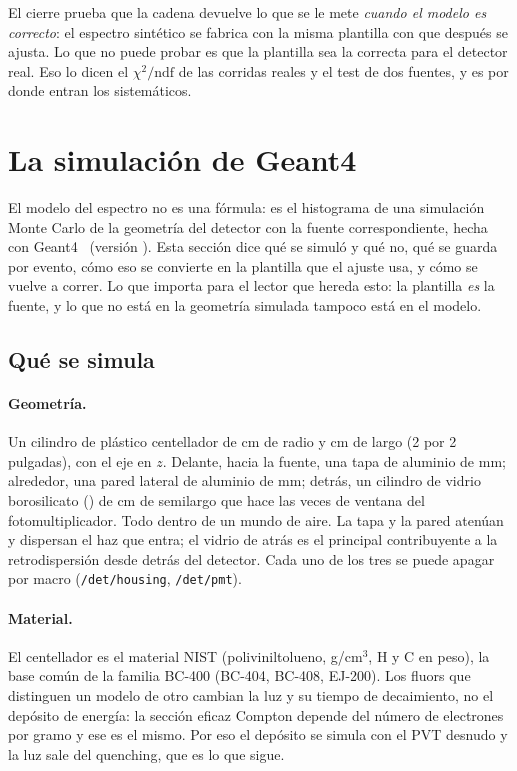 \documentclass[11pt,a4paper]{article}
\begin{document}
\begin{aviso}
El cierre prueba que la cadena devuelve lo que se le mete \emph{cuando el
modelo es correcto}: el espectro sintético se fabrica con la misma plantilla
con que después se ajusta. Lo que no puede probar es que la plantilla sea la
correcta para el detector real. Eso lo dicen el $\chi^2/\text{ndf}$ de las
corridas reales y el test de dos fuentes, y es por donde entran los
sistemáticos.
\end{aviso}

\section{La simulación de Geant4}
\label{sec:geant4}

El modelo del espectro no es una fórmula: es el histograma de una simulación
Monte Carlo de la geometría del detector con la fuente correspondiente, hecha
con Geant4~\cite{agostinelli2003,allison2016} (versión \SimVersion). Esta
sección dice qué se simuló y qué no, qué se guarda por evento, cómo eso se
convierte en la plantilla que el ajuste usa, y cómo se vuelve a correr. Lo que
importa para el lector que hereda esto: la plantilla \emph{es} la fuente, y
lo que no está en la geometría simulada tampoco está en el modelo.

\subsection{Qué se simula}

\paragraph{Geometría.} Un cilindro de plástico centellador de \SimRadio{} cm de
radio y \SimLargo{} cm de largo (2 por 2 pulgadas), con el eje en $z$. Delante,
hacia la fuente, una tapa de aluminio de \SimTapa{} mm; alrededor, una pared
lateral de aluminio de \SimPared{} mm; detrás, un cilindro de vidrio
borosilicato (\SimVentanaPmt) de \SimPmtSemilargo{} cm de semilargo que hace
las veces de ventana del fotomultiplicador. Todo dentro de un mundo de aire.
La tapa y la pared atenúan y dispersan el haz que entra; el vidrio de atrás es
el principal contribuyente a la retrodispersión desde detrás del detector.
Cada uno de los tres se puede apagar por macro (\texttt{/det/housing},
\texttt{/det/pmt}).

\paragraph{Material.} El centellador es el material NIST
\SimMaterial{} (poliviniltolueno, \SimDensidad{} g/cm$^3$, H
\XcomFraccionH{} y C \XcomFraccionC{} en peso), la base común de la familia
BC-400 (BC-404, BC-408, EJ-200). Los fluors que distinguen un modelo de otro
cambian la luz y su tiempo de decaimiento, no el depósito de energía: la
sección eficaz Compton depende del número de electrones por gramo y ese es el
mismo. Por eso el depósito se simula con el PVT desnudo y la luz sale del
quenching, que es lo que sigue.
\end{document}

